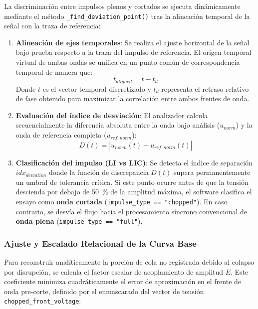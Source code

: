 La discriminación entre impulsos plenos y cortados se ejecuta dinámicamente mediante el método \texttt{\_find\_deviation\_point()} tras la alineación temporal de la señal con la traza de referencia:

\begin{enumerate}
    \item \textbf{Alineación de ejes temporales}: Se realiza el ajuste horizontal de la señal bajo prueba respecto a la traza del impulso de referencia. El origen temporal virtual de ambas ondas se unifica en un punto común de correspondencia temporal de manera que:
    \begin{equation}
    \label{eq:eje_alineado}
    t_{aligned} = t - t_d
    \end{equation}
    Donde $t$ es el vector temporal discretizado y $t_d$ representa el retraso relativo de fase obtenido para maximizar la correlación entre ambos frentes de onda.
    \item \textbf{Evaluación del índice de desviación}: El analizador calcula secuencialmente la diferencia absoluta entre la onda bajo análisis ($u_{norm}$) y la onda de referencia completa ($u_{ref,norm}$):
    \begin{equation}
    \label{eq:funcion_desviacion}
    D(t) = | u_{norm}(t) - u_{ref,norm}(t) |
    \end{equation}
    \item \textbf{Clasificación del impulso (LI vs LIC)}: Se detecta el índice de separación $idx_{deviation}$ donde la función de discrepancia $D(t)$ supera permanentemente un umbral de tolerancia crítica. Si este punto ocurre antes de que la tensión descienda por debajo de \qty{50}{\percent} de la amplitud máxima, el software clasifica el ensayo como \textbf{onda cortada} (\texttt{impulse\_type == "chopped"}). En caso contrario, se desvía el flujo hacia el procesamiento síncrono convencional de \textbf{onda plena} (\texttt{impulse\_type == "full"}).
\end{enumerate}

\subsubsection{Ajuste y Escalado Relacional de la Curva Base}
\label{subsubsection:escalado_curva_base}

Para reconstruir analíticamente la porción de cola no registrada debido al colapso por disrupción, se calcula el factor escalar de acoplamiento de amplitud $E$. Este coeficiente minimiza cuadráticamente el error de aproximación en el frente de onda pre-corte, definido por el enmascarado del vector de tensión \texttt{chopped\_front\_voltage}:

